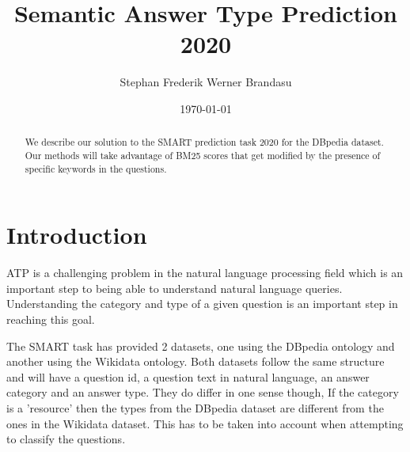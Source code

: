 \documentclass[sigconf]{acmart}
\begin{document}

\title{Semantic Answer Type Prediction 2020}

\author{Stephan Frederik Werner Brandasu}

\date{\today}



\begin{abstract}
We describe our solution to the \gls{SMART} prediction task 2020 for the DBpedia dataset. Our methods will take advantage of BM25 scores that get modified by the presence of specific keywords in the questions.
\end{abstract}


\renewcommand\footnotetextcopyrightpermission[1]{}
\pagestyle{plain}

\maketitle



\section{Introduction}
\gls{ATP} is a challenging problem in the natural language processing field which is an important step to being able to understand natural language queries. Understanding the category and type of a given question is an important step in reaching this goal.

The \gls{SMART} task has provided 2 datasets, one using the DBpedia ontology and another using the Wikidata ontology.
Both datasets follow the same structure and will have a question id, a question text in natural language, an answer category and an answer type. They do differ in one sense though, If the category is a 'resource' then the types from the DBpedia dataset are different from the ones in the Wikidata dataset. This has to be taken into account when attempting to classify the questions.
\end{document}

